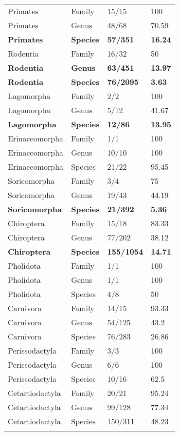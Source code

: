 \begin{longtable}{llll}
  Primates & Family & 15/15 & 100 \\ 
  Primates & Genus & 48/68 & 70.59 \\ 
  \textbf{Primates} & \textbf{Species} & \textbf{57/351} & \textbf{16.24} \\ 
  Rodentia & Family & 16/32 & 50 \\ 
  \textbf{Rodentia} & \textbf{Genus} & \textbf{63/451} & \textbf{13.97} \\ 
  \textbf{Rodentia} & \textbf{Species} & \textbf{76/2095} & \textbf{3.63} \\ 
  Lagomorpha & Family & 2/2 & 100 \\ 
  Lagomorpha & Genus & 5/12 & 41.67 \\ 
  \textbf{Lagomorpha} & \textbf{Species} & \textbf{12/86} & \textbf{13.95} \\ 
  Erinaceomorpha & Family & 1/1 & 100 \\ 
  Erinaceomorpha & Genus & 10/10 & 100 \\ 
  Erinaceomorpha & Species & 21/22 & 95.45 \\ 
  Soricomorpha & Family & 3/4 & 75 \\ 
  Soricomorpha & Genus & 19/43 & 44.19 \\ 
  \textbf{Soricomorpha} & \textbf{Species} & \textbf{21/392} & \textbf{5.36} \\ 
  Chiroptera & Family & 15/18 & 83.33 \\ 
  Chiroptera & Genus & 77/202 & 38.12 \\ 
  \textbf{Chiroptera} & \textbf{Species} & \textbf{155/1054} & \textbf{14.71} \\ 
  Pholidota & Family & 1/1 & 100 \\ 
  Pholidota & Genus & 1/1 & 100 \\ 
  Pholidota & Species & 4/8 & 50 \\ 
  Carnivora & Family & 14/15 & 93.33 \\ 
  Carnivora & Genus & 54/125 & 43.2 \\ 
  Carnivora & Species & 76/283 & 26.86 \\ 
  Perissodactyla & Family & 3/3 & 100 \\ 
  Perissodactyla & Genus & 6/6 & 100 \\ 
  Perissodactyla & Species & 10/16 & 62.5 \\ 
  Cetartiodactyla & Family & 20/21 & 95.24 \\ 
  Cetartiodactyla & Genus & 99/128 & 77.34 \\ 
  Cetartiodactyla & Species & 150/311 & 48.23 \\ 
   \hline
\hline
\label{Table_morpho_taxa_proportion}
\end{longtable}
